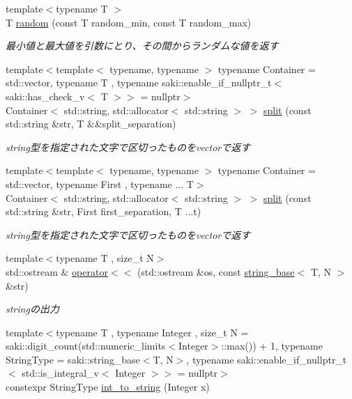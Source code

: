 \begin{DoxyCompactItemize}
{\footnotesize template$<$typename T $>$ }\\T \mbox{\hyperlink{namespacesaki_a636caf16f2f00cb734cc867646ac233f}{random}} (const T random\+\_\+min, const T random\+\_\+max)
\begin{DoxyCompactList}\small\item\em 最小値と最大値を引数にとり、その間からランダムな値を返す \end{DoxyCompactList}\item 
{\footnotesize template$<$template$<$ typename, typename $>$ typename Container = std\+::vector, typename T , typename saki\+::enable\+\_\+if\+\_\+nullptr\+\_\+t$<$ saki\+::has\+\_\+check\+\_\+v$<$ T $>$$>$  = nullptr$>$ }\\Container$<$ std\+::string, std\+::allocator$<$ std\+::string $>$ $>$ \mbox{\hyperlink{namespacesaki_ad15185db28f6e77d65411ca83f64f5bb}{split}} (const std\+::string \&str, T \&\&split\+\_\+separation)
\begin{DoxyCompactList}\small\item\em string型を指定された文字で区切ったものをvectorで返す \end{DoxyCompactList}\item 
{\footnotesize template$<$template$<$ typename, typename $>$ typename Container = std\+::vector, typename First , typename ... T$>$ }\\Container$<$ std\+::string, std\+::allocator$<$ std\+::string $>$ $>$ \mbox{\hyperlink{namespacesaki_ac1464436ac78ade2ba14371e2efe1fd2}{split}} (const std\+::string \&str, First first\+\_\+separation, T ...t)
\begin{DoxyCompactList}\small\item\em string型を指定された文字で区切ったものをvectorで返す \end{DoxyCompactList}\item 
{\footnotesize template$<$typename T , size\+\_\+t N$>$ }\\std\+::ostream \& \mbox{\hyperlink{namespacesaki_abf390d4e6c19fdb92d3a68afb7e71032}{operator$<$$<$}} (std\+::ostream \&os, const \mbox{\hyperlink{classsaki_1_1string__base}{string\+\_\+base}}$<$ T, N $>$ \&str)
\begin{DoxyCompactList}\small\item\em stringの出力 \end{DoxyCompactList}\item 
{\footnotesize template$<$typename T , typename Integer , size\+\_\+t N = saki\+::digit\+\_\+count(std\+::numeric\+\_\+limits$<$\+Integer$>$\+::max()) + 1, typename String\+Type  = saki\+::string\+\_\+base$<$\+T, N$>$, typename saki\+::enable\+\_\+if\+\_\+nullptr\+\_\+t$<$ std\+::is\+\_\+integral\+\_\+v$<$ Integer $>$$>$  = nullptr$>$ }\\constexpr String\+Type \mbox{\hyperlink{namespacesaki_a52a09941a80893dfdea6da4c220fba08}{int\+\_\+to\+\_\+string}} (Integer x)

\end{DoxyCompactItemize}
